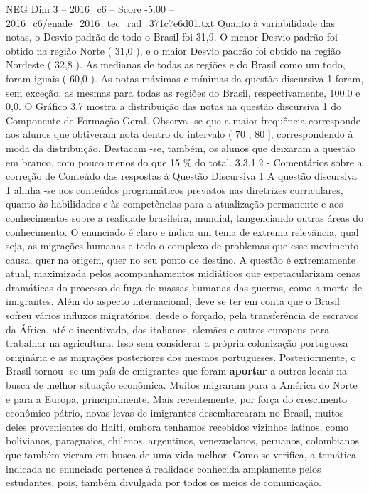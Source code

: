 \begin{textsample}{NEG Dim 3 – 2016\_c6 – Score -5.00 – 2016\_c6/enade\_2016\_tec\_rad\_371c7e6d01.txt}
Quanto à variabilidade das notas, o Desvio padrão de todo o Brasil foi 31,9.
O menor Desvio padrão foi obtido na região Norte ( 31,0 ), e o maior Desvio padrão foi obtido na região Nordeste ( 32,8 ).
As medianas de todas as regiões e do Brasil como um todo, foram iguais ( 60,0 ).
As notas máximas e mínimas da questão discursiva 1 foram, sem exceção, as mesmas para todas as regiões do Brasil, respectivamente, 100,0 e 0,0.
O Gráfico 3.7 mostra a distribuição das notas na questão discursiva 1 do Componente de Formação Geral.
Observa -se que a maior frequência corresponde aos alunos que obtiveram nota dentro do intervalo ( 70 ; 80 ], correspondendo à moda da distribuição.
Destacam -se, também, os alunos que deixaram a questão em branco, com pouco menos do que 15 \% do total. 3.3.1.2 - Comentários sobre a correção de Conteúdo das respostas à Questão Discursiva 1 A questão discursiva 1 alinha -se aos conteúdos programáticos previstos nas diretrizes curriculares, quanto às habilidades e às competências para a atualização permanente e aos conhecimentos sobre a realidade brasileira, mundial, tangenciando outras áreas do conhecimento.
O enunciado é claro e indica um tema de extrema relevância, qual seja, as migrações humanas e todo o complexo de problemas que esse movimento causa, quer na origem, quer no seu ponto de destino.
A questão é extremamente atual, maximizada pelos acompanhamentos midiáticos que espetacularizam cenas dramáticas do processo de fuga de massas humanas das guerras, como a morte de imigrantes.
Além do aspecto internacional, deve se ter em conta que o Brasil sofreu vários influxos migratórios, desde o forçado, pela transferência de escravos da África, até o incentivado, dos italianos, alemães e outros europeus para trabalhar na agricultura.
Isso sem considerar a própria colonização portuguesa originária e as migrações posteriores dos mesmos portugueses.
Posteriormente, o Brasil tornou -se um país de emigrantes que foram \textbf{aportar} a outros locais na busca de melhor situação econômica.
Muitos migraram para a América do Norte e para a Europa, principalmente.
Mais recentemente, por força do crescimento econômico pátrio, novas levas de imigrantes desembarcaram no Brasil, muitos deles provenientes do Haiti, embora tenhamos recebidos vizinhos latinos, como bolivianos, paraguaios, chilenos, argentinos, venezuelanos, peruanos, colombianos que também vieram em busca de uma vida melhor.
Como se verifica, a temática indicada no enunciado pertence à realidade conhecida amplamente pelos estudantes, pois, também divulgada por todos os meios de comunicação.

\end{textsample}
